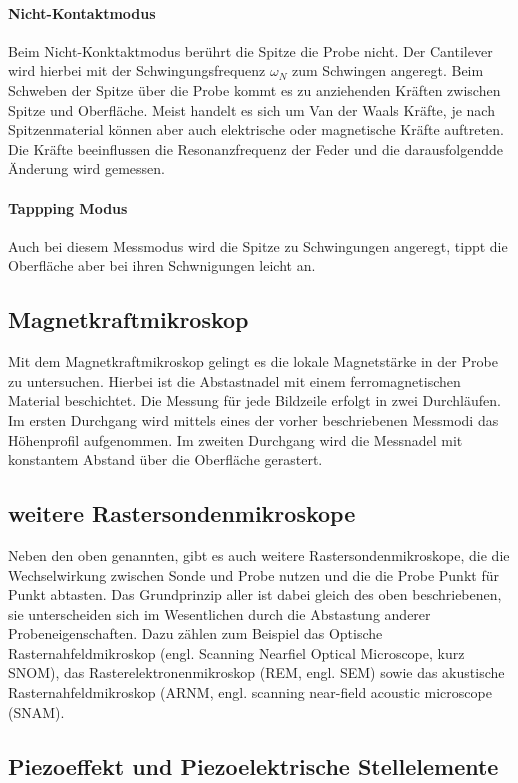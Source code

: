 \documentclass[a4paper,twoside,final]{article}
\begin{document}
\paragraph{Nicht-Kontaktmodus}
Beim Nicht-Konktaktmodus berührt die Spitze die Probe nicht. Der Cantilever wird hierbei mit der Schwingungsfrequenz $\omega_N$ zum Schwingen angeregt. Beim Schweben der Spitze über die Probe kommt es zu anziehenden Kräften zwischen Spitze und Oberfläche. Meist handelt es sich um Van der Waals Kräfte, je nach Spitzenmaterial können aber auch elektrische oder magnetische Kräfte auftreten. Die Kräfte beeinflussen die Resonanzfrequenz der Feder und die darausfolgendde Änderung wird gemessen.

\paragraph{Tappping Modus}
Auch bei diesem Messmodus wird die Spitze zu Schwingungen angeregt, tippt die Oberfläche aber bei ihren Schwnigungen leicht an.

\subsection{Magnetkraftmikroskop}
Mit dem Magnetkraftmikroskop gelingt es die lokale Magnetstärke in der Probe zu untersuchen. Hierbei ist die Abstastnadel mit einem ferromagnetischen Material beschichtet. Die Messung für jede Bildzeile erfolgt in zwei Durchläufen. Im ersten Durchgang wird mittels eines der vorher beschriebenen Messmodi das Höhenprofil aufgenommen. Im zweiten Durchgang wird die Messnadel mit konstantem Abstand über die Oberfläche gerastert.

\subsection{weitere Rastersondenmikroskope}
Neben den oben genannten, gibt es auch weitere  Rastersondenmikroskope, die die Wechselwirkung zwischen Sonde und Probe nutzen und die die Probe Punkt für Punkt abtasten. Das Grundprinzip aller ist dabei gleich des oben beschriebenen, sie unterscheiden sich im Wesentlichen durch die Abstastung anderer Probeneigenschaften. Dazu zählen zum Beispiel das Optische Rasternahfeldmikroskop (engl. Scanning Nearfiel Optical Microscope, kurz SNOM), das Rasterelektronenmikroskop (REM, engl. SEM) sowie das akustische Rasternahfeldmikroskop (ARNM, engl. scanning near-field acoustic microscope (SNAM).
\subsection{Piezoeffekt und Piezoelektrische Stellelemente}
\end{document}
